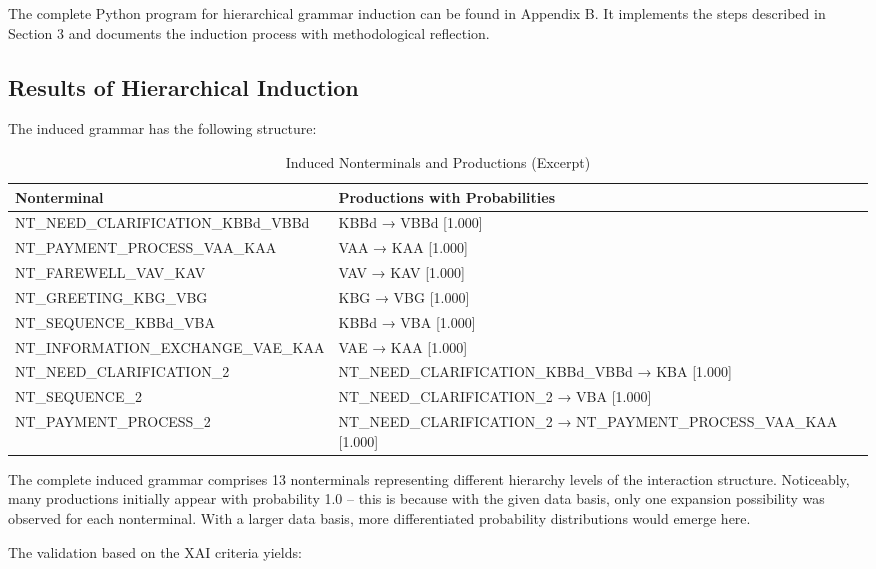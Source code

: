 \documentclass[
  12pt,
  a4paper,
  oneside,
  titlepage
]{article}
\begin{document}
The complete Python program for hierarchical grammar induction can be 
found in Appendix B. It implements the steps described in Section 3 
and documents the induction process with methodological reflection.

\subsection{Results of Hierarchical Induction}

The induced grammar has the following structure:

\begin{table}[h]
\centering
\caption{Induced Nonterminals and Productions (Excerpt)}
\label{tab:results}
\begin{tabular}{@{} l l @{}}
\toprule
\textbf{Nonterminal} & \textbf{Productions with Probabilities} \\
\midrule
NT\_NEED\_CLARIFICATION\_KBBd\_VBBd & KBBd → VBBd [1.000] \\
NT\_PAYMENT\_PROCESS\_VAA\_KAA & VAA → KAA [1.000] \\
NT\_FAREWELL\_VAV\_KAV & VAV → KAV [1.000] \\
NT\_GREETING\_KBG\_VBG & KBG → VBG [1.000] \\
NT\_SEQUENCE\_KBBd\_VBA & KBBd → VBA [1.000] \\
NT\_INFORMATION\_EXCHANGE\_VAE\_KAA & VAE → KAA [1.000] \\
NT\_NEED\_CLARIFICATION\_2 & NT\_NEED\_CLARIFICATION\_KBBd\_VBBd → KBA [1.000] \\
NT\_SEQUENCE\_2 & NT\_NEED\_CLARIFICATION\_2 → VBA [1.000] \\
NT\_PAYMENT\_PROCESS\_2 & NT\_NEED\_CLARIFICATION\_2 → NT\_PAYMENT\_PROCESS\_VAA\_KAA [1.000] \\
\bottomrule
\end{tabular}
\end{table}

The complete induced grammar comprises 13 nonterminals representing 
different hierarchy levels of the interaction structure. Noticeably, 
many productions initially appear with probability 1.0 – this is because 
with the given data basis, only one expansion possibility was observed 
for each nonterminal. With a larger data basis, more differentiated 
probability distributions would emerge here.

The validation based on the XAI criteria yields:
\end{document}
